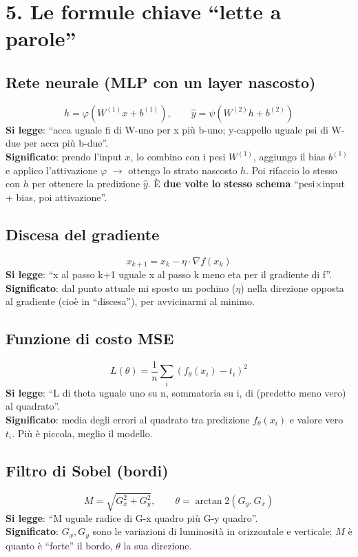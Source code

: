 \documentclass[11pt,a4paper]{article}
\begin{document}
\newpage
\section*{5. Le formule chiave \enquote{lette a parole}}

\subsection*{Rete neurale (MLP con un layer nascosto)}
\[ h = \varphi(W^{(1)} x + b^{(1)}), \qquad \hat{y} = \psi(W^{(2)} h + b^{(2)}) \]
\textbf{Si legge}: \enquote{acca uguale fi di W-uno per x più b-uno; y-cappello
uguale psi di W-due per acca più b-due}.\\
\textbf{Significato}: prendo l'input $x$, lo combino con i pesi $W^{(1)}$, aggiungo
il bias $b^{(1)}$ e applico l'attivazione $\varphi$ $\rightarrow$ ottengo lo strato
nascosto $h$. Poi rifaccio lo stesso con $h$ per ottenere la predizione $\hat{y}$.
È \textbf{due volte lo stesso schema} \enquote{pesi$\times$input + bias, poi attivazione}.

\subsection*{Discesa del gradiente}
\[ x_{k+1} = x_k - \eta \cdot \nabla f(x_k) \]
\textbf{Si legge}: \enquote{x al passo k+1 uguale x al passo k meno eta per il
gradiente di f}.\\
\textbf{Significato}: dal punto attuale mi sposto un pochino ($\eta$) nella
direzione opposta al gradiente (cioè in \enquote{discesa}), per avvicinarmi al minimo.

\subsection*{Funzione di costo MSE}
\[ L(\theta) = \frac{1}{n}\sum_i (f_\theta(x_i) - t_i)^2 \]
\textbf{Si legge}: \enquote{L di theta uguale uno su n, sommatoria su i, di
(predetto meno vero) al quadrato}.\\
\textbf{Significato}: media degli errori al quadrato tra predizione $f_\theta(x_i)$
e valore vero $t_i$. Più è piccola, meglio il modello.

\subsection*{Filtro di Sobel (bordi)}
\[ M = \sqrt{G_x^2 + G_y^2}, \qquad \theta = \arctan2(G_y, G_x) \]
\textbf{Si legge}: \enquote{M uguale radice di G-x quadro più G-y quadro}.\\
\textbf{Significato}: $G_x,G_y$ sono le variazioni di luminosità in orizzontale e
verticale; $M$ è quanto è \enquote{forte} il bordo, $\theta$ la sua direzione.
\end{document}

